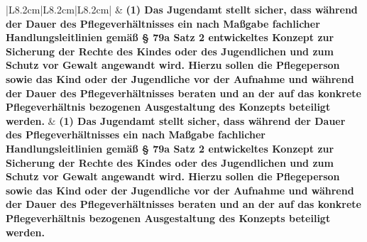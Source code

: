 \documentclass[10pt,a4paper,landscape]{article}
\begin{document}
\begin{longtable}{|L{8.2cm}|L{8.2cm}|L{8.2cm}|}
 & \textbf{(1) Das Jugendamt stellt sicher, dass  \newline während der Dauer des  \newline Pflegeverhältnisses ein nach Maßgabe  \newline fachlicher Handlungsleitlinien gemäß \S{}  \newline 79a Satz 2 entwickeltes Konzept zur  \newline Sicherung der Rechte des Kindes oder  \newline des Jugendlichen und zum Schutz vor  \newline Gewalt angewandt wird. Hierzu sollen  \newline die Pflegeperson sowie das Kind oder  \newline der Jugendliche vor der Aufnahme und  \newline während der Dauer des  \newline Pflegeverhältnisses beraten und an der  \newline auf das konkrete Pflegeverhältnis  \newline bezogenen Ausgestaltung des Konzepts  \newline beteiligt werden. } & \textbf{(1) Das Jugendamt stellt sicher, dass  \newline während der Dauer des  \newline Pflegeverhältnisses ein nach Maßgabe  \newline fachlicher Handlungsleitlinien gemäß \S{}  \newline 79a Satz 2 entwickeltes Konzept zur  \newline Sicherung der Rechte des Kindes oder  \newline des Jugendlichen und zum Schutz vor  \newline Gewalt angewandt wird. Hierzu sollen  \newline die Pflegeperson sowie das Kind oder  \newline der Jugendliche vor der Aufnahme und  \newline während der Dauer des  \newline Pflegeverhältnisses beraten und an der  \newline auf das konkrete Pflegeverhältnis  \newline bezogenen Ausgestaltung des Konzepts  \newline beteiligt werden. } \\
\hhline{|---|}

\end{longtable}
\end{document}
